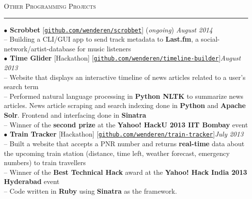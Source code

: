 \documentclass[a4paper,9pt]{article}
\begin{document}
\Large{\textsc{Other Programming Projects}}\vspace{1.5pt}
\hrule\vspace{0.25cm}
\small
\textbf{$\bullet$ Scrobbet} [\href{https://github.com/wenderen/scrobbet}{\texttt{github.com/wenderen/scrobbet}}] (\textit{ongoing}) \hfill \textit{August 2014}\\
-- Building a CLI/GUI app to send track metadata to \textbf{Last.fm}, a social-network/artist-database for music listeners\\
\textbf{$\bullet$ Time Glider} [Hackathon] [\href{https://github.com/wenderen/timeline-builder}{\texttt{github.com/wenderen/timeline-builder}}]\hfill \textit{August 2013}\\
-- Website that displays an interactive timeline of news articles related to a user's search term\\
-- Performed natural language processing in \textbf{Python NLTK} to summarize news articles. News article scraping and search indexing done in \textbf{Python} and \textbf{Apache Solr}. Frontend and interfacing done in \textbf{Sinatra}\\
-- Winner of the \textbf{second prize} at the \textbf{Yahoo! HackU 2013 IIT Bombay} event\\
\textbf{$\bullet$ Train Tracker} [Hackathon] [\href{https://github.com/wenderen/train-tracker}{\texttt{github.com/wenderen/train-tracker}}]\hfill \textit{July 2013}\\
-- Built a website that accepts a PNR number and returns \textbf{real-time} data about the upcoming train station (distance, time left, weather forecast, emergency numbers) to train travellers\\
-- Winner of the \textbf{Best Technical Hack} award at the \textbf{Yahoo! Hack India 2013 Hyderabad} event\\
-- Code written in \textbf{Ruby} using \textbf{Sinatra} as the framework.\\
\end{document}
